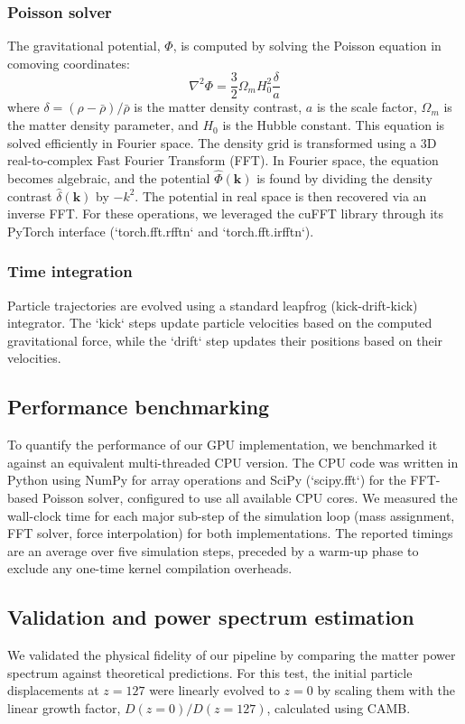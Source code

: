 \documentclass[]{article}
\begin{document}
\subsubsection{Poisson solver}
The gravitational potential, $\Phi$, is computed by solving the Poisson equation in comoving coordinates:
\begin{equation}
    \nabla^2 \Phi = \frac{3}{2} \Omega_m H_0^2 \frac{\delta}{a}
\end{equation}
where $\delta = (\rho - \bar{\rho}) / \bar{\rho}$ is the matter density contrast, $a$ is the scale factor, $\Omega_m$ is the matter density parameter, and $H_0$ is the Hubble constant. This equation is solved efficiently in Fourier space. The density grid is transformed using a 3D real-to-complex Fast Fourier Transform (FFT). In Fourier space, the equation becomes algebraic, and the potential $\hat{\Phi}(\mathbf{k})$ is found by dividing the density contrast $\hat{\delta}(\mathbf{k})$ by $-k^2$. The potential in real space is then recovered via an inverse FFT. For these operations, we leveraged the cuFFT library through its PyTorch interface (`torch.fft.rfftn` and `torch.fft.irfftn`).

\subsubsection{Time integration}
Particle trajectories are evolved using a standard leapfrog (kick-drift-kick) integrator. The `kick` steps update particle velocities based on the computed gravitational force, while the `drift` step updates their positions based on their velocities.

\subsection{Performance benchmarking}
To quantify the performance of our GPU implementation, we benchmarked it against an equivalent multi-threaded CPU version. The CPU code was written in Python using NumPy for array operations and SciPy (`scipy.fft`) for the FFT-based Poisson solver, configured to use all available CPU cores. We measured the wall-clock time for each major sub-step of the simulation loop (mass assignment, FFT solver, force interpolation) for both implementations. The reported timings are an average over five simulation steps, preceded by a warm-up phase to exclude any one-time kernel compilation overheads.

\subsection{Validation and power spectrum estimation}
We validated the physical fidelity of our pipeline by comparing the matter power spectrum against theoretical predictions. For this test, the initial particle displacements at $z=127$ were linearly evolved to $z=0$ by scaling them with the linear growth factor, $D(z=0)/D(z=127)$, calculated using CAMB.
\end{document}
